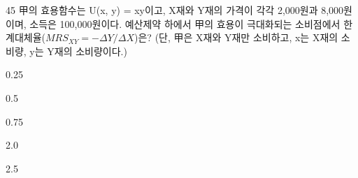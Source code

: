 \begin{question}{45}
甲의 효용함수는 U(x, y) = xy이고, X재와 Y재의 가격이 각각 2,000원과 8,000원이며, 소득은 100,000원이다. 예산제약 하에서 甲의 효용이 극대화되는 소비점에서 한계대체율($MRS_{XY} = -\Delta Y/\Delta X$)은? (단, 甲은 X재와 Y재만 소비하고, x는 X재의 소비량, y는 Y재의 소비량이다.)
\begin{choices}
  \item 0.25
  \item 0.5
  \item 0.75
  \item 2.0
  \item 2.5
\end{choices}
\end{question}
